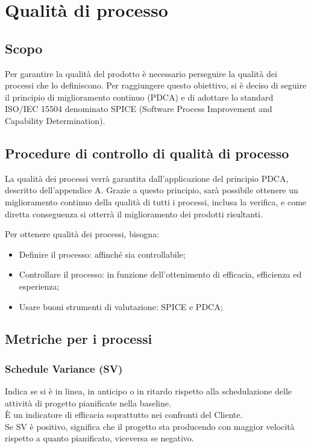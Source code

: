 \documentclass[PianoDiQualifica.tex]{subfiles}
\begin{document}
\chapter{Qualità di processo}

\section{Scopo} 
Per garantire la qualità del prodotto è necessario perseguire la qualità dei processi che lo definiscono.
Per raggiungere questo obiettivo, si è deciso di seguire il principio di miglioramento continuo (PDCA) e di adottare lo standard ISO/IEC 15504 denominato SPICE (Software Process Improvement and Capability Determination).

\section{Procedure di controllo di qualità di processo}
La qualità dei processi verrà garantita dall'applicazione del principio PDCA, descritto dell'appendice A. Grazie a questo principio, sarà possibile ottenere un miglioramento continuo della qualità di tutti i processi, inclusa la verifica, e come diretta conseguenza si otterrà il miglioramento dei prodotti risultanti. 

Per ottenere qualità dei processi, bisogna:
\begin{itemize}
	\item Definire il processo: affinché sia controllabile;
	\item Controllare il processo: in funzione dell'ottenimento di efficacia, efficienza ed esperienza;
	\item Usare buoni strumenti di valutazione: SPICE e PDCA;
\end{itemize}

\section{Metriche per i processi}

\subsection{Schedule Variance (SV)}
Indica se si è in linea, in anticipo o in ritardo rispetto alla schedulazione delle attività di progetto pianificate nella baseline.\\
È un indicatore di efficacia soprattutto nei confronti del Cliente. \\
Se SV è positivo, significa che il progetto sta producendo con maggior velocità rispetto a quanto pianificato, viceversa se negativo.
\end{document}
